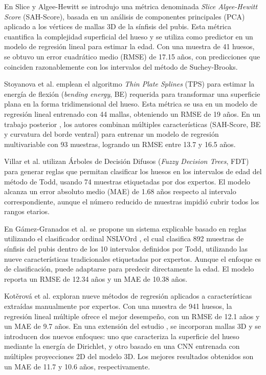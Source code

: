 En Slice y Algee-Hewitt \cite{slice2015modeling} se introdujo una métrica denominada \textit{Slice Algee-Hewitt Score} (SAH-Score), basada en un análisis de componentes principales (PCA) aplicado a los vértices de mallas 3D de la sínfisis del pubis. Esta métrica cuantifica la complejidad superficial del hueso y se utiliza como predictor en un modelo de regresión lineal para estimar la edad. Con una muestra de 41 huesos, se obtuvo un error cuadrático medio (RMSE) de 17.15 años, con predicciones que coinciden razonablemente con los intervalos del método de Suchey-Brooks.

Stoyanova et al. \cite{stoyanova2015enhanced} emplean el algoritmo \textit{Thin Plate Splines} (TPS) para estimar la energía de flexión (\textit{bending energy}, BE) requerida para transformar una superficie plana en la forma tridimensional del hueso. Esta métrica se usa en un modelo de regresión lineal entrenado con 44 mallas, obteniendo un RMSE de 19 años. En un trabajo posterior \cite{stoyanova2017computational}, los autores combinan múltiples características (SAH-Score, BE y curvatura del borde ventral) para entrenar un modelo de regresión multivariable con 93 muestras, logrando un RMSE entre 13.7 y 16.5 años.

Villar et al. \cite{villar2017first} utilizan Árboles de Decisión Difusos (\textit{Fuzzy Decision Trees}, FDT) para generar reglas que permitan clasificar los huesos en los intervalos de edad del método de Todd, usando 74 muestras etiquetadas por dos expertos. El modelo alcanza un error absoluto medio (MAE) de 1.68 años respecto al intervalo correspondiente, aunque el número reducido de muestras impidió cubrir todos los rangos etarios.

En Gámez-Granados et al. \cite{granados} se propone un sistema explicable basado en reglas utilizando el clasificador ordinal NSLVOrd \cite{gamez2016ordinal}, el cual clasifica 892 muestras de sínfisis del pubis dentro de los 10 intervalos definidos por Todd, utilizando las nueve características tradicionales etiquetadas por expertos. Aunque el enfoque es de clasificación, puede adaptarse para predecir directamente la edad. El modelo reporta un RMSE de 12.34 años y un MAE de 10.38 años.

Kotěrová et al. \cite{kotverova2018age} exploran nueve métodos de regresión aplicados a características extraídas manualmente por expertos. Con una muestra de 941 huesos, la regresión lineal múltiple ofrece el mejor desempeño, con un RMSE de 12.1 años y un MAE de 9.7 años. En una extensión del estudio \cite{koterova_computational_2022}, se incorporan mallas 3D y se introducen dos nuevos enfoques: uno que caracteriza la superficie del hueso mediante la energía de Dirichlet, y otro basado en una CNN entrenada con múltiples proyecciones 2D del modelo 3D. Los mejores resultados obtenidos son un MAE de 11.7 y 10.6 años, respectivamente.

